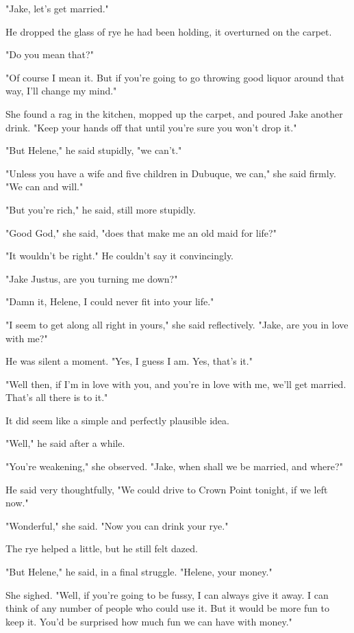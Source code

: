 \documentclass{novel}
\begin{document}
"Jake, let's get married."

He dropped the glass of rye he had been holding, it overturned on the carpet.

"Do you mean that?"

"Of course I mean it. But if you're going to go throwing good liquor around that way, I'll change my mind."

She found a rag in the kitchen, mopped up the carpet, and poured Jake another drink. "Keep your hands off that until you're sure you won't drop it."

"But Helene," he said stupidly, "we can't."

"Unless you have a wife and five children in Dubuque, we can," she said firmly. "We can and will."

"But you're rich," he said, still more stupidly.

"Good God," she said, "does that make me an old maid for life?"

"It wouldn't be right." He couldn't say it convincingly.

"Jake Justus, are you turning me down?"

"Damn it, Helene, I could never fit into your life."

"I seem to get along all right in yours," she said reflectively. "Jake, are you in love with me?"

He was silent a moment. "Yes, I guess I am. Yes, that's it."

"Well then, if I'm in love with you, and you're in love with me, we'll get married. That's all there is to it."

It did seem like a simple and perfectly plausible idea.

"Well," he said after a while.

"You're weakening," she observed. "Jake, when shall we be married, and where?"

He said very thoughtfully, "We could drive to Crown Point tonight, if we left now."

"Wonderful," she said. "Now you can drink your rye."

The rye helped a little, but he still felt dazed.

"But Helene," he said, in a final struggle. "Helene, your money."

She sighed. "Well, if you're going to be fussy, I can always give it away. I can think of any number of people who could use it. But it would be more fun to keep it. You'd be surprised how much fun we can have with money."
\end{document}
